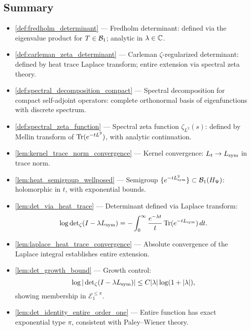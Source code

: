 \subsection*{Summary}

\begin{itemize}
  \item \cref{def:fredholm_determinant} — Fredholm determinant: defined via the eigenvalue product for \( T \in \mathcal{B}_1 \); analytic in \( \lambda \in \mathbb{C} \).

  \item \cref{def:carleman_zeta_determinant} — Carleman \(\zeta\)-regularized determinant: defined by heat trace Laplace transform; entire extension via spectral zeta theory.

  \item \cref{def:spectral_decomposition_compact} — Spectral decomposition for compact self-adjoint operators: complete orthonormal basis of eigenfunctions with discrete spectrum.

  \item \cref{def:spectral_zeta_function} — Spectral zeta function \( \zeta_{L^2}(s) \): defined by Mellin transform of \( \operatorname{Tr}(e^{-t L^2}) \), with analytic continuation.
  
  \item \cref{lem:kernel_trace_norm_convergence} — Kernel convergence: \( L_t \to L_{\mathrm{sym}} \) in trace norm.

  \item \cref{lem:heat_semigroup_wellposed} — Semigroup \( \{e^{-tL_{\mathrm{sym}}^2}\} \subset \mathcal{B}_1(H_{\Psi}) \): holomorphic in \( t \), with exponential bounds.

  \item \cref{lem:det_via_heat_trace} — Determinant defined via Laplace transform:
  \[
  \log \det\nolimits_\zeta(I - \lambda L_{\mathrm{sym}}) = - \int_0^\infty \frac{e^{-\lambda t}}{t} \operatorname{Tr}(e^{-t L_{\mathrm{sym}}}) \, dt.
  \]

  \item \cref{lem:laplace_heat_trace_convergence} — Absolute convergence of the Laplace integral establishes entire extension.

  \item \cref{lem:det_growth_bound} — Growth control:
  \[
  \log |\det\nolimits_\zeta(I - \lambda L_{\mathrm{sym}})| \le C |\lambda| \log(1 + |\lambda|),
  \]
  showing membership in \( \mathcal{E}_1^{\leq \pi} \).

  \item \cref{lem:det_identity_entire_order_one} — Entire function has exact exponential type \( \pi \), consistent with Paley–Wiener theory.


\end{itemize}

